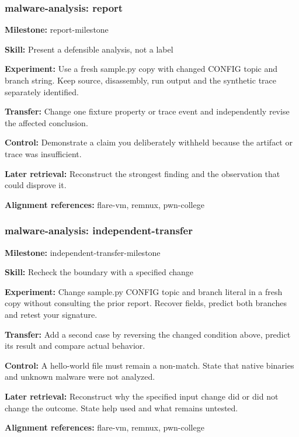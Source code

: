 \subsubsection{malware-analysis: report}
\noindent\textbf{Milestone:} report-milestone\par
\noindent\textbf{Skill:} Present a defensible analysis, not a label\par
\noindent\textbf{Experiment:} Use a fresh sample.py copy with changed CONFIG topic and branch string. Keep source, disassembly, run output and the synthetic trace separately identified.\par
\noindent\textbf{Transfer:} Change one fixture property or trace event and independently revise the affected conclusion.\par
\noindent\textbf{Control:} Demonstrate a claim you deliberately withheld because the artifact or trace was insufficient.\par
\noindent\textbf{Later retrieval:} Reconstruct the strongest finding and the observation that could disprove it.\par
\noindent\textbf{Alignment references:} flare-vm, remnux, pwn-college\par
\subsubsection{malware-analysis: independent-transfer}
\noindent\textbf{Milestone:} independent-transfer-milestone\par
\noindent\textbf{Skill:} Recheck the boundary with a specified change\par
\noindent\textbf{Experiment:} Change sample.py CONFIG topic and branch literal in a fresh copy without consulting the prior report. Recover fields, predict both branches and retest your signature.\par
\noindent\textbf{Transfer:} Add a second case by reversing the changed condition above, predict its result and compare actual behavior.\par
\noindent\textbf{Control:} A hello-world file must remain a non-match. State that native binaries and unknown malware were not analyzed.\par
\noindent\textbf{Later retrieval:} Reconstruct why the specified input change did or did not change the outcome. State help used and what remains untested.\par
\noindent\textbf{Alignment references:} flare-vm, remnux, pwn-college\par

